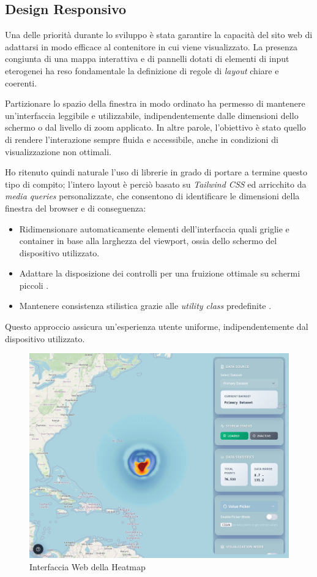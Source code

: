 \subsection{Design Responsivo}

Una delle priorità durante lo sviluppo è stata garantire la capacità del sito web di adattarsi in modo efficace al contenitore in cui viene visualizzato. La presenza congiunta di una mappa interattiva e di pannelli dotati di elementi di input eterogenei ha reso fondamentale la definizione di regole di \textit{layout} chiare e coerenti. 

Partizionare lo spazio della finestra in modo ordinato ha permesso di mantenere un'interfaccia leggibile e utilizzabile, indipendentemente dalle dimensioni dello schermo o dal livello di zoom applicato. In altre parole, l'obiettivo è stato quello di rendere l'interazione sempre fluida e accessibile, anche in condizioni di visualizzazione non ottimali.

Ho ritenuto quindi naturale l'uso di librerie in grado di portare a termine questo tipo di compito; l'intero layout è perciò basato su \textit{Tailwind CSS} ed arricchito da \textit{media queries} personalizzate, che consentono di identificare le dimensioni della finestra del browser e di conseguenza:
\begin{itemize}
  \item Ridimensionare automaticamente elementi dell'interfaccia quali griglie e container in base alla larghezza del viewport, ossia dello schermo del dispositivo utilizzato.
  \item Adattare la disposizione dei controlli per una fruizione ottimale su schermi piccoli \cite{tailwind-responsive}.
  \item Mantenere consistenza stilistica grazie alle \textit{utility class} predefinite \cite{tailwind-docs}.
\end{itemize}

Questo approccio assicura un'esperienza utente uniforme, indipendentemente dal dispositivo utilizzato.

\begin{figure}
    \centering
    \includegraphics[width=0.86\linewidth]{images/whole-map-homepage.png}
    \caption{Interfaccia Web della Heatmap}
    \label{fig:heatmap-homepage}
\end{figure}

